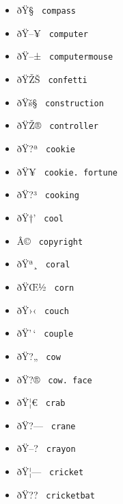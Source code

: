 \begin{itemize}
\item
  \label{symbol-compass}{{ ðŸ§­ } \texttt{\ compass\ }}
\item
  \label{symbol-computer}{{ ðŸ--¥ }
  \texttt{\ computer\ }}
\item
  \label{symbol-computermouse}{{ ðŸ--± }
  \texttt{\ computermouse\ }}
\item
  \label{symbol-confetti}{{ ðŸŽŠ } \texttt{\ confetti\ }}
\item
  \label{symbol-construction}{{ ðŸš§ }
  \texttt{\ construction\ }}
\item
  \label{symbol-controller}{{ ðŸŽ® }
  \texttt{\ controller\ }}
\item
  \label{symbol-cookie}{{ ðŸ?ª } \texttt{\ cookie\ }}
\item
  \label{symbol-cookie.fortune}{{ ðŸ¥ }
  \texttt{\ cookie.\ fortune\ }}
\item
  \label{symbol-cooking}{{ ðŸ?³ } \texttt{\ cooking\ }}
\item
  \label{symbol-cool}{{ ðŸ†' } \texttt{\ cool\ }}
\item
  \label{symbol-copyright}{{ Â© } \texttt{\ copyright\ }}
\item
  \label{symbol-coral}{{ ðŸª¸ } \texttt{\ coral\ }}
\item
  \label{symbol-corn}{{ ðŸŒ½ } \texttt{\ corn\ }}
\item
  \label{symbol-couch}{{ ðŸ›‹ } \texttt{\ couch\ }}
\item
  \label{symbol-couple}{{ ðŸ'\,` } \texttt{\ couple\ }}
\item
  \label{symbol-cow}{{ ðŸ?„ } \texttt{\ cow\ }}
\item
  \label{symbol-cow.face}{{ ðŸ?® }
  \texttt{\ cow.\ face\ }}
\item
  \label{symbol-crab}{{ ðŸ¦€ } \texttt{\ crab\ }}
\item
  \label{symbol-crane}{{ ðŸ?--- } \texttt{\ crane\ }}
\item
  \label{symbol-crayon}{{ ðŸ--? } \texttt{\ crayon\ }}
\item
  \label{symbol-cricket}{{ ðŸ¦--- } \texttt{\ cricket\ }}
\item
  \label{symbol-cricketbat}{{ ðŸ?? }
  \texttt{\ cricketbat\ }}

\end{itemize}
